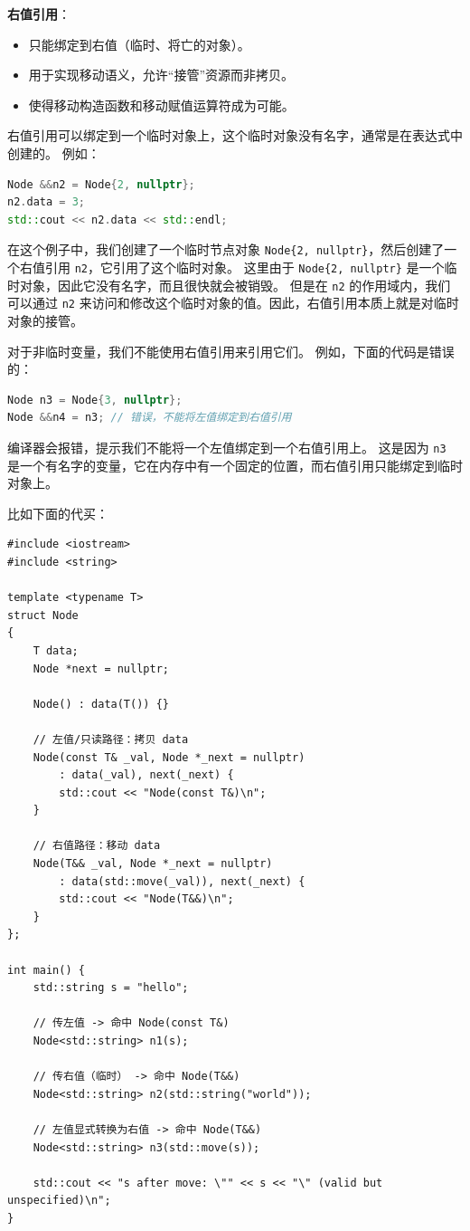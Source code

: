 \documentclass[a4paper]{ctexart}
\theoremstyle{definition}
\theoremstyle{definition}
\begin{document}
\textbf{右值引用}：
\begin{itemize}
  \item 只能绑定到右值（临时、将亡的对象）。
  \item 用于实现移动语义，允许“接管”资源而非拷贝。
  \item 使得移动构造函数和移动赋值运算符成为可能。
\end{itemize}

右值引用可以绑定到一个临时对象上，这个临时对象没有名字，通常是在表达式中创建的。 例如：
\begin{lstlisting}[language=c++]
Node &&n2 = Node{2, nullptr};
n2.data = 3;
std::cout << n2.data << std::endl;
\end{lstlisting}
在这个例子中，我们创建了一个临时节点对象 \verb|Node{2, nullptr}|，然后创建了一个右值引用 \verb|n2|，它引用了这个临时对象。 
这里由于 \verb|Node{2, nullptr}| 是一个临时对象，因此它没有名字，而且很快就会被销毁。 
但是在 \verb|n2| 的作用域内，我们可以通过 \verb|n2| 来访问和修改这个临时对象的值。因此，右值引用本质上就是对临时对象的接管。

对于非临时变量，我们不能使用右值引用来引用它们。 例如，下面的代码是错误的：
\begin{lstlisting}[language=c++]
Node n3 = Node{3, nullptr};
Node &&n4 = n3; // 错误，不能将左值绑定到右值引用
\end{lstlisting}
编译器会报错，提示我们不能将一个左值绑定到一个右值引用上。 这是因为 \verb|n3| 是一个有名字的变量，它在内存中有一个固定的位置，而右值引用只能绑定到临时对象上。

比如下面的代买：
\begin{lstlisting}
#include <iostream>
#include <string>

template <typename T>
struct Node
{
    T data;
    Node *next = nullptr;

    Node() : data(T()) {}

    // 左值/只读路径：拷贝 data
    Node(const T& _val, Node *_next = nullptr)
        : data(_val), next(_next) {
        std::cout << "Node(const T&)\n";
    }

    // 右值路径：移动 data
    Node(T&& _val, Node *_next = nullptr)
        : data(std::move(_val)), next(_next) {
        std::cout << "Node(T&&)\n";
    }
};

int main() {
    std::string s = "hello";

    // 传左值 -> 命中 Node(const T&)
    Node<std::string> n1(s);

    // 传右值（临时） -> 命中 Node(T&&)
    Node<std::string> n2(std::string("world"));

    // 左值显式转换为右值 -> 命中 Node(T&&)
    Node<std::string> n3(std::move(s));

    std::cout << "s after move: \"" << s << "\" (valid but unspecified)\n";
}  
\end{lstlisting}
\end{document}
